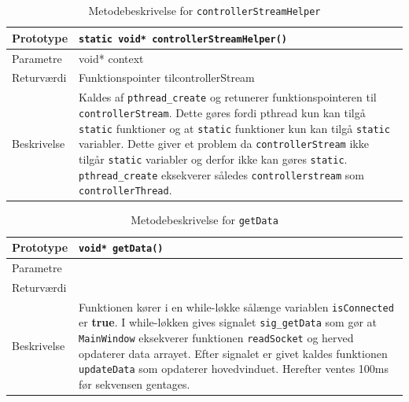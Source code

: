 \begin{table}[H]
\begin{tabularx}{\textwidth}{| L{2.5 cm} | Z |} \hline
Prototype & \texttt{static void* controllerStreamHelper()} \\\hline
Parametre & void* context  \\\hline
Returværdi & Funktionspointer tilcontrollerStream  \\\hline
Beskrivelse & Kaldes af \texttt{pthread\_create} og retunerer funktionspointeren til \texttt{controllerStream}. Dette gøres fordi pthread kun kan tilgå \texttt{static} funktioner og at \texttt{static} funktioner kun kan tilgå \texttt{static} variabler. Dette giver et problem da \texttt{controllerStream} ikke tilgår \texttt{static} variabler og derfor ikke kan gøres \texttt{static}. \texttt{pthread\_create} eksekverer således \texttt{controllerstream} som \texttt{controllerThread}.\\\hline
\end{tabularx}
\caption{Metodebeskrivelse for \texttt{controllerStreamHelper}}
\label{table:met_controllerStreamHelper}
\end{table}

\begin{table}[H]
\begin{tabularx}{\textwidth}{| L{2.5 cm} | Z |} \hline
Prototype & \texttt{void* getData()} \\\hline
Parametre &   \\\hline
Returværdi &  \\\hline
Beskrivelse & Funktionen kører i en while-løkke sålænge variablen \texttt{isConnected} er \textbf{true}. I while-løkken gives signalet \texttt{sig\_getData} som gør at \texttt{MainWindow} eksekverer funktionen \texttt{readSocket} og herved opdaterer data arrayet. Efter signalet er givet kaldes funktionen \texttt{updateData} som opdaterer hovedvinduet. Herefter ventes 100ms før sekvensen gentages.  \\\hline
\end{tabularx}
\caption{Metodebeskrivelse for \texttt{getData}}
\label{table:met_getData}
\end{table}

